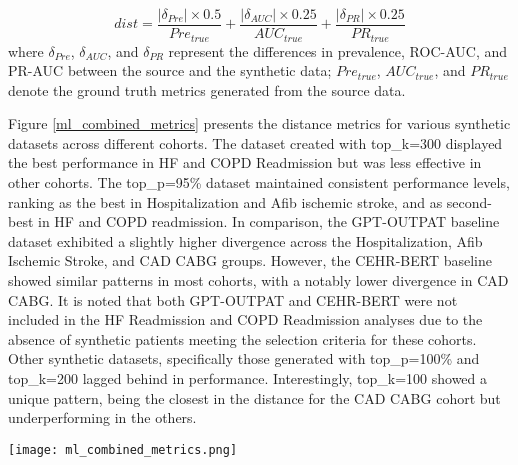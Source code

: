 \begin{multicols}{2}
\[
    dist = \frac{|\delta_{Pre}|\times 0.5}{Pre_{true}} + \frac{|\delta_{AUC}| \times 0.25}{AUC_{true}} + \frac{|\delta_{PR}| \times 0.25}{PR_{true}}
\]
where $\delta_{Pre}$, $\delta_{AUC}$, and $\delta_{PR}$ represent the differences in prevalence, ROC-AUC, and PR-AUC between the source and the synthetic data; $Pre_{true}$, $AUC_{true}$, and $PR_{true}$ denote the ground truth metrics generated from the source data. 

Figure \ref{ml_combined_metrics} presents the distance metrics for various synthetic datasets across different cohorts. The dataset created with top\_k=300 displayed the best performance in HF and COPD Readmission but was less effective in other cohorts. The top\_p=95\% dataset maintained consistent performance levels, ranking as the best in Hospitalization and Afib ischemic stroke,  and as second-best in HF and COPD readmission. In comparison, the GPT-OUTPAT baseline dataset exhibited a slightly higher divergence across the Hospitalization, Afib Ischemic Stroke, and CAD CABG groups. However, the CEHR-BERT baseline showed similar patterns in most cohorts, with a notably lower divergence in CAD CABG. It is noted that both GPT-OUTPAT and CEHR-BERT were not included in the HF Readmission and COPD Readmission analyses due to the absence of synthetic patients meeting the selection criteria for these cohorts. Other synthetic datasets, specifically those generated with top\_p=100\% and top\_k=200 lagged behind in performance. Interestingly, top\_k=100 showed a unique pattern, being the closest in the distance for the CAD CABG cohort but underperforming in the others. 

\begin{Figure}
    \texttt{[image: ml\_combined\_metrics.png]}
    \label{ml_combined_metrics}
\end{Figure}


\end{multicols}
